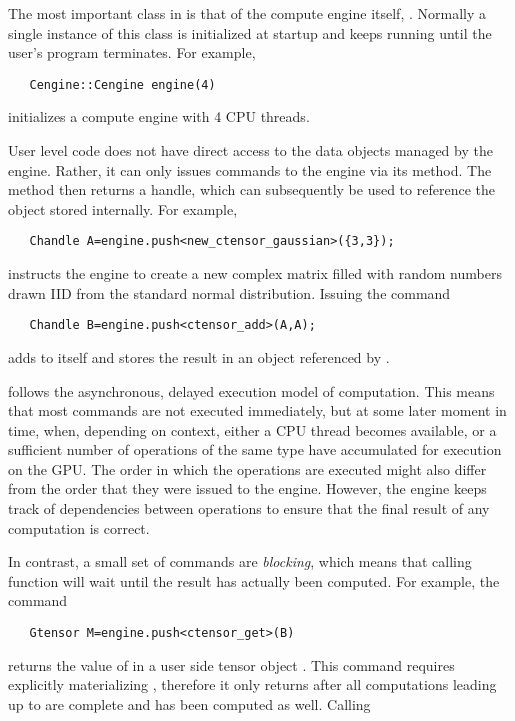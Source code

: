 The most important class in \Cengine{} is that of the compute engine itself, . 
Normally a single instance of this class is initialized at startup and keeps running until 
the user's program terminates. For example, 

\texttt{~~~Cengine::Cengine engine(4)}

initializes a compute engine with 4 CPU threads. 

User level code does not have direct access to the data objects managed by the engine. 
Rather, it can only issues commands to the engine via its  method. 
The  method then returns a handle, which can subsequently be used to reference the object 
stored internally. For example, 

\texttt{~~~Chandle A=engine.push<new\_ctensor\_gaussian>(\{3,3\});}

instructs the engine to create a new  complex matrix filled with random numbers 
drawn IID from the standard normal distribution. Issuing the command 

\texttt{~~~Chandle B=engine.push<ctensor\_add>(A,A);}

adds  to itself and stores the result in an object referenced by . 

\Cengine{} follows the asynchronous, delayed execution model of computation. This means that most  
commands are not executed immediately, but at some later moment in time, when,  
depending on context, either a CPU thread becomes available, or a sufficient number of operations 
of the same type have accumulated for execution on the GPU. 
The order in which the operations are executed might also differ from the order that they 
were issued to the engine. 
However, the engine keeps track of dependencies between operations to ensure that the final result of 
any computation is correct. 
 

In contrast, a small set of commands are \emph{blocking}, which means that calling function will  
wait until the result has actually been computed. For example, the command 

\texttt{~~~Gtensor M=engine.push<ctensor\_get>(B)}

returns the value of  in a user side tensor object . This command requires 
explicitly materializing , therefore it only returns after all computations leading up to  
are complete and  has been computed as well. Calling 

